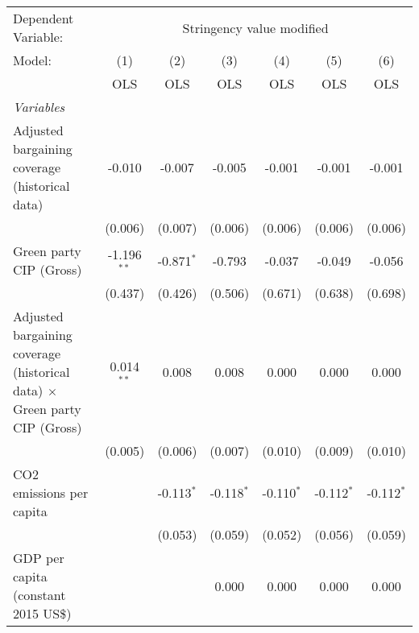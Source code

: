 
\begingroup
\centering
\begin{tabular}{lcccccc}
   \toprule
   Dependent Variable: & \multicolumn{6}{c}{Stringency value modified}\\
   Model:                                                                           & (1)           & (2)          & (3)          & (4)          & (5)          & (6)\\  
                                                                                    &  OLS          & OLS          & OLS          & OLS          & OLS          & OLS\\  
   \midrule
   \emph{Variables}\\
   Adjusted bargaining coverage (historical data)                                   & -0.010        & -0.007       & -0.005       & -0.001       & -0.001       & -0.001\\   
                                                                                    & (0.006)       & (0.007)      & (0.006)      & (0.006)      & (0.006)      & (0.006)\\   
   Green party CIP (Gross)                                                          & -1.196$^{**}$ & -0.871$^{*}$ & -0.793       & -0.037       & -0.049       & -0.056\\   
                                                                                    & (0.437)       & (0.426)      & (0.506)      & (0.671)      & (0.638)      & (0.698)\\   
   Adjusted bargaining coverage (historical data) $\times$ Green party CIP (Gross)  & 0.014$^{**}$  & 0.008        & 0.008        & 0.000        & 0.000        & 0.000\\   
                                                                                    & (0.005)       & (0.006)      & (0.007)      & (0.010)      & (0.009)      & (0.010)\\   
   CO2 emissions per capita                                                         &               & -0.113$^{*}$ & -0.118$^{*}$ & -0.110$^{*}$ & -0.112$^{*}$ & -0.112$^{*}$\\   
                                                                                    &               & (0.053)      & (0.059)      & (0.052)      & (0.056)      & (0.059)\\   
   GDP per capita (constant 2015 US\$)                                              &               &              & 0.000        & 0.000        & 0.000        & 0.000\\   

\end{tabular}
